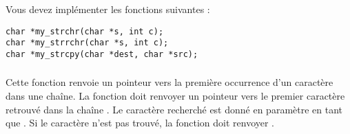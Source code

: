 

\vspace*{0.7cm}

\noindent {}

\bigskip


\bigskip


\noindent Vous devez implémenter les fonctions suivantes :

\bigskip

\lstset{language=C}
\begin{lstlisting}[frame=single]
char *my_strchr(char *s, int c);
char *my_strrchr(char *s, int c);
char *my_strcpy(char *dest, char *src);
\end{lstlisting}


\subsubsection*{}

\noindent Cette fonction renvoie un pointeur vers la première occurrence d'un caractère dans une chaîne.
La fonction doit renvoyer un pointeur vers le premier caractère retrouvé dans la chaîne .
Le caractère recherché est donné en paramètre en tant que .
Si le caractère n'est pas trouvé, la fonction doit renvoyer .


